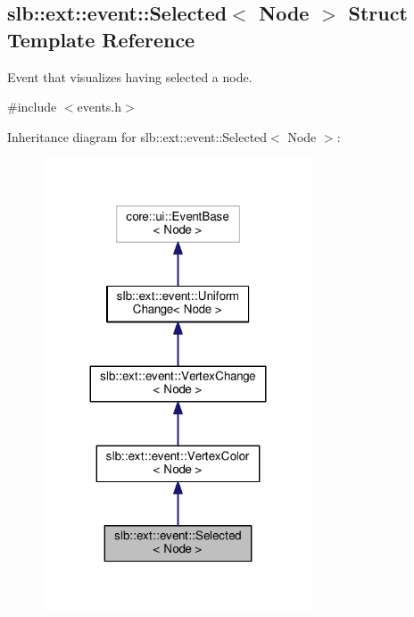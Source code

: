 \hypertarget{structslb_1_1ext_1_1event_1_1Selected}{}\subsection{slb\+:\+:ext\+:\+:event\+:\+:Selected$<$ Node $>$ Struct Template Reference}
\label{structslb_1_1ext_1_1event_1_1Selected}


Event that visualizes having selected a node.  




{\ttfamily \#include $<$events.\+h$>$}



Inheritance diagram for slb\+:\+:ext\+:\+:event\+:\+:Selected$<$ Node $>$\+:\nopagebreak
\begin{figure}[H]
\begin{center}
\leavevmode
\includegraphics[width=227pt]{structslb_1_1ext_1_1event_1_1Selected__inherit__graph}
\end{center}
\end{figure}


